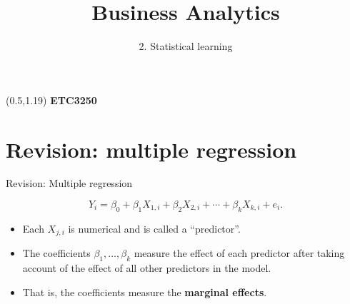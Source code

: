 \documentclass[14pt]{beamer}
\title[2. Statistical learning]{Business Analytics}
\author{2. Statistical learning}
\makeatletter
\def\biz{\begin{itemize}[<+-| alert@+>]}
\def\eiz{\end{itemize}}
\makeatother
\begin{document}
\begin{frame}[plain]{}
\maketitle
\begin{textblock}{11}(0.5,1.19){\color{white}\large
\textbf{ETC3250}}
\end{textblock}
\end{frame}

\section{Revision: multiple regression}


\begin{frame}{Revision: Multiple regression}

\begin{block}{}\vspace*{-0.75cm}
$$Y_i = \beta_0 + \beta_1 X_{1,i} + \beta_2 X_{2,i} + \cdots + \beta_kX_{k,i} + e_i.$$
\end{block}
\biz
\item Each $X_{j,i}$ is numerical and is called a ``predictor''.

\item The coefficients $\beta_1,\dots,\beta_k$ measure the effect of each
predictor after taking account of the effect of all other predictors
in the model.

\item That is, the coefficients measure the \textbf{marginal effects}.

\eiz

\end{frame}
\end{document}
